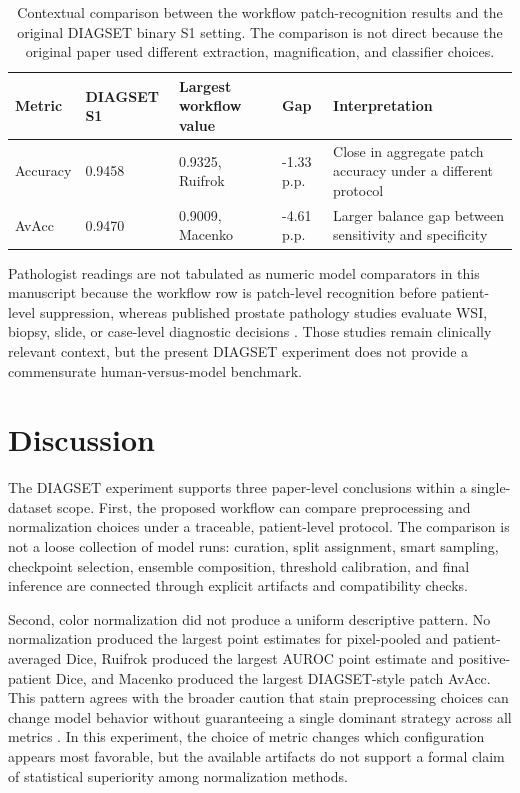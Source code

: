 \documentclass[a4paper,fleqn]{cas-dc}
\begin{document}
\begin{table}[t]
\caption{Contextual comparison between the workflow patch-recognition results and the original DIAGSET binary S1 setting. The comparison is not direct because the original paper used different extraction, magnification, and classifier choices.}
\label{tab:diagset-original-context}
\centering
\fontsize{7.8}{8.8}\selectfont
\setlength{\tabcolsep}{5pt}
\begin{tabular}{P{3.0cm}P{2.4cm}P{3.8cm}P{2.0cm}P{4.4cm}}
\toprule
Metric & DIAGSET S1 & Largest workflow value & Gap & Interpretation \\
\midrule
Accuracy & 0.9458 & 0.9325, Ruifrok & -1.33 p.p. & Close in aggregate patch accuracy under a different protocol \\
AvAcc & 0.9470 & 0.9009, Macenko & -4.61 p.p. & Larger balance gap between sensitivity and specificity \\
\bottomrule
\end{tabular}
\end{table}

Pathologist readings are not tabulated as numeric model comparators in this manuscript because the workflow row is patch-level recognition before patient-level suppression, whereas published prostate pathology studies evaluate WSI, biopsy, slide, or case-level diagnostic decisions \cite{raciti2020novel,raciti2023clinical,eloy2023artificial}. Those studies remain clinically relevant context, but the present DIAGSET experiment does not provide a commensurate human-versus-model benchmark.

\section{Discussion}

The DIAGSET experiment supports three paper-level conclusions within a single-dataset scope. First, the proposed workflow can compare preprocessing and normalization choices under a traceable, patient-level protocol. The comparison is not a loose collection of model runs: curation, split assignment, smart sampling, checkpoint selection, ensemble composition, threshold calibration, and final inference are connected through explicit artifacts and compatibility checks.

Second, color normalization did not produce a uniform descriptive pattern. No normalization produced the largest point estimates for pixel-pooled and patient-averaged Dice, Ruifrok produced the largest AUROC point estimate and positive-patient Dice, and Macenko produced the largest DIAGSET-style patch AvAcc. This pattern agrees with the broader caution that stain preprocessing choices can change model behavior without guaranteeing a single dominant strategy across all metrics \cite{tellez2019augmentation}. In this experiment, the choice of metric changes which configuration appears most favorable, but the available artifacts do not support a formal claim of statistical superiority among normalization methods.
\end{document}
